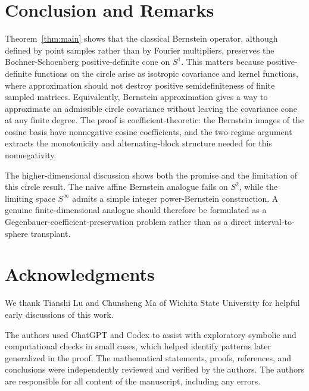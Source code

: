 \documentclass[a4paper,12pt]{amsart}
\theoremstyle{definition}
\theoremstyle{remark}
\begin{document}
\section{Conclusion and Remarks}
Theorem~\ref{thm:main} shows that the classical Bernstein operator, although defined by point samples rather than by Fourier multipliers, preserves the Bochner-Schoenberg positive-definite cone on $S^1$. This matters because positive-definite functions on the circle arise as isotropic covariance and kernel functions, where approximation should not destroy positive semidefiniteness of finite sampled matrices. Equivalently, Bernstein approximation gives a way to approximate an admissible circle covariance without leaving the covariance cone at any finite degree. The proof is coefficient-theoretic: the Bernstein images of the cosine basis have nonnegative cosine coefficients, and the two-regime argument extracts the monotonicity and alternating-block structure needed for this nonnegativity.

The higher-dimensional discussion shows both the promise and the limitation of this circle result. The naive affine Bernstein analogue fails on $S^2$, while the limiting space $S^\infty$ admits a simple integer power-Bernstein construction. A genuine finite-dimensional analogue should therefore be formulated as a Gegenbauer-coefficient-preservation problem rather than as a direct interval-to-sphere transplant.

\section*{Acknowledgments}
We thank Tianshi Lu and Chunsheng Ma of Wichita State University for helpful early discussions of this work.

The authors used ChatGPT and Codex to assist with exploratory symbolic and computational checks in small cases, which helped identify patterns later generalized in the proof. The mathematical statements, proofs, references, and conclusions were independently reviewed and verified by the authors. The authors are responsible for all content of the manuscript, including any errors.



\end{document}
